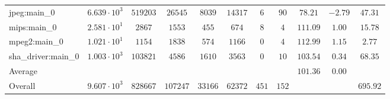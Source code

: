 \begin{tabular}{|l|c|c|c|c|c|c|c|c|c|c|}
jpeg:main\_0            & $ 6.639 \cdot 10^{3} $ & $ 519203 $ & $ 26545  $ & $ 8039  $ & $ 14317 $ & $ 6   $ & $ 90  $ & $ 78.21       $ & $ -2.79   $ & $ 47.31   $ \\
mips:main\_0            & $ 2.581 \cdot 10^{1} $ & $ 2867   $ & $ 1553   $ & $ 455   $ & $ 674   $ & $ 8   $ & $ 4   $ & $ 111.09      $ & $ 1.00    $ & $ 15.78   $ \\
mpeg2:main\_0           & $ 1.021 \cdot 10^{1} $ & $ 1154   $ & $ 1838   $ & $ 574   $ & $ 1166  $ & $ 0   $ & $ 4   $ & $ 112.99      $ & $ 1.15    $ & $ 2.77    $ \\
sha\_driver:main\_0     & $ 1.003 \cdot 10^{3} $ & $ 103821 $ & $ 4586   $ & $ 1610  $ & $ 3563  $ & $ 0   $ & $ 10  $ & $ 103.54      $ & $ 0.34    $ & $ 68.35   $ \\
\hline
Average                 & $                    $ & $        $ & $        $ & $       $ & $       $ & $     $ & $     $ & $ 101.36      $ & $ 0.00    $ & $         $ \\
\hline
Overall                 & $ 9.607 \cdot 10^{3} $ & $ 828667 $ & $ 107247 $ & $ 33166 $ & $ 62372 $ & $ 451 $ & $ 152 $ & $             $ & $         $ & $ 695.92  $ \\
\hline
\end{tabular}
